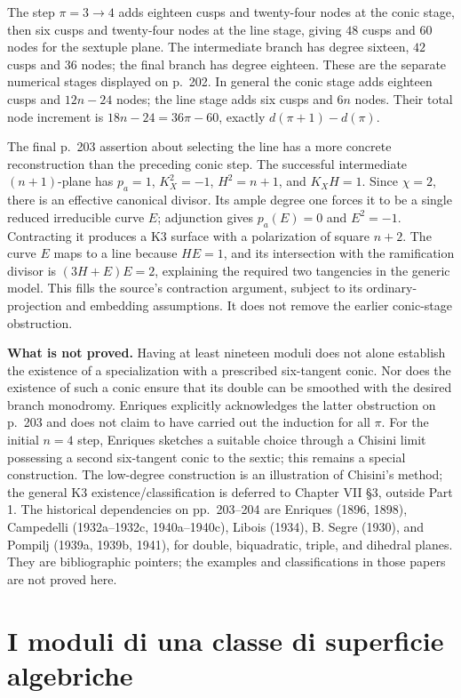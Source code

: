 The step \(\pi=3\to4\) adds eighteen cusps and twenty-four nodes at the conic stage, then six cusps and twenty-four nodes at the line stage, giving \(48\) cusps and \(60\) nodes for the sextuple plane. The intermediate branch has degree sixteen, \(42\) cusps and \(36\) nodes; the final branch has degree eighteen. These are the separate numerical stages displayed on p.~202. In general the conic stage adds eighteen cusps and \(12n-24\) nodes; the line stage adds six cusps and \(6n\) nodes. Their total node increment is \(18n-24=36\pi-60\), exactly \(d(\pi+1)-d(\pi)\).

The final p.~203 assertion about selecting the line has a more concrete reconstruction than the preceding conic step. The successful intermediate \((n+1)\)-plane has \(p_a=1\), \(K_X^2=-1\), \(H^2=n+1\), and \(K_X H=1\). Since \(\chi=2\), there is an effective canonical divisor. Its ample degree one forces it to be a single reduced irreducible curve \(E\); adjunction gives \(p_a(E)=0\) and \(E^2=-1\). Contracting it produces a K3 surface with a polarization of square \(n+2\). The curve \(E\) maps to a line because \(HE=1\), and its intersection with the ramification divisor is \((3H+E)E=2\), explaining the required two tangencies in the generic model. This fills the source's contraction argument, subject to its ordinary-projection and embedding assumptions. It does not remove the earlier conic-stage obstruction.

\textbf{What is not proved.} Having at least nineteen moduli does not alone establish the existence of a specialization with a prescribed six-tangent conic. Nor does the existence of such a conic ensure that its double can be smoothed with the desired branch monodromy. Enriques explicitly acknowledges the latter obstruction on p.~203 and does not claim to have carried out the induction for all \(\pi\). For the initial \(n=4\) step, Enriques sketches a suitable choice through a Chisini limit possessing a second six-tangent conic to the sextic; this remains a special construction. The low-degree construction is an illustration of Chisini's method; the general K3 existence/classification is deferred to Chapter VII §3, outside Part 1. The historical dependencies on pp.~203--204 are Enriques (1896, 1898), Campedelli (1932a--1932c, 1940a--1940c), Libois (1934), B. Segre (1930), and Pompilj (1939a, 1939b, 1941), for double, biquadratic, triple, and dihedral planes. They are bibliographic pointers; the examples and classifications in those papers are not proved here.

\section{I moduli di una classe di superficie algebriche}
\label{cp1-v-11}

